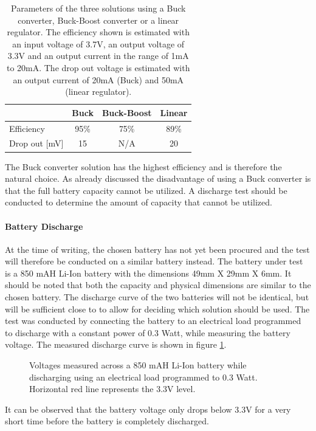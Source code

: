 \begin{table}[h]
	\centering
	\begin{tabular}{l|c|c|c}
		  				&	Buck 	& Buck-Boost 	& Linear\\
		 \hline
		 Efficiency  	&  95\% 	& 75\%			&89\%		\\
		 Drop out [mV]		&15  	& N/A		&20		\\
	\end{tabular}
	\caption[Parameters of voltage generation solutions.]{Parameters of the three solutions using a Buck converter, Buck-Boost converter or a linear regulator. The efficiency shown is estimated with an input voltage of 3.7V, an output voltage of 3.3V and an output current in the range of 1mA to 20mA. The drop out voltage is estimated with an output current of 20mA (Buck) and 50mA (linear regulator).}
	\label{tab:vol_gen_joint}
\end{table}

The Buck converter solution has the highest efficiency and is therefore the natural choice.
As already discussed the disadvantage of using a Buck converter is that the full battery capacity cannot be utilized.
A discharge test should be conducted to determine the amount of capacity that cannot be utilized.


\paragraph{Battery Discharge}
At the time of writing, the chosen battery has not yet been procured and the test will therefore be conducted on a similar battery instead.
The battery under test is a 850 mAH Li-Ion battery with the dimensions 49mm X 29mm X 6mm.
It should be noted that both the capacity and physical dimensions are similar to the chosen battery.
The discharge curve of the two batteries will not be identical, but will be sufficient close to to allow for deciding which solution should be used.
The test was conducted by connecting the battery to an electrical load programmed to discharge with a constant power of 0.3 Watt, while measuring the battery voltage.
The measured discharge curve is shown in figure \ref{fig:bat_discharge}.

\begin{figure}[h]
	\centering
    
	\caption{Voltages measured across a 850 mAH Li-Ion battery while discharging using an electrical load programmed to 0.3 Watt. Horizontal red line represents the 3.3V level.}
	\label{fig:bat_discharge}
\end{figure}
It can be observed that the battery voltage only drops below 3.3V for a very short time before the battery is completely discharged.

